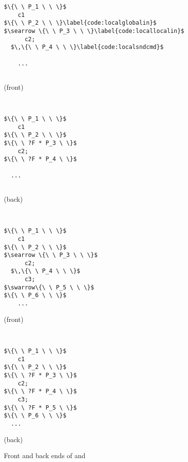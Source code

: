 \begin{figure}
\begin{minipage}{.15\textwidth}
\begin{lstlisting}[basicstyle=\linespread{0.8}\normalfont\footnotesize\tt]
$\{\ \ P_1 \ \ \}$
    c1
$\{\ \ P_2 \ \ \}\label{code:localglobalin}$
$\searrow \{\ \ P_3 \ \ \}\label{code:locallocalin}$
      c2;
  $\,\{\ \ P_4 \ \ \}\label{code:localsndcmd}$

    ...


\end{lstlisting}
\centerline{\footnotesize(front)}
\end{minipage} \vline ~
\begin{minipage}{.15\textwidth}
\begin{lstlisting}[numbers=none, basicstyle=\linespread{0.8}\normalfont\footnotesize\tt]
$\{\ \ P_1 \ \ \}$
    c1
$\{\ \ P_2 \ \ \}$
$\{\ \ ?F * P_3 \ \}$
    c2;
$\{\ \ ?F * P_4 \ \}$

  ...


\end{lstlisting}
\centerline{\footnotesize(back)}
\end{minipage} \vline ~
\begin{minipage}{.15\textwidth}
\begin{lstlisting}[numbers=none, basicstyle=\linespread{0.8}\normalfont\footnotesize\tt]
$\{\ \ P_1 \ \ \}$
    c1
$\{\ \ P_2 \ \ \}$
$\searrow \{\ \ P_3 \ \ \}$
      c2;
  $\,\{\ \ P_4 \ \ \}$
      c3;
$\swarrow\{\ \ P_5 \ \ \}$
$\{\ \ P_6 \ \ \}$
    ...
\end{lstlisting}
\centerline{\footnotesize(front)}
\end{minipage} \vline ~
\begin{minipage}{.15\textwidth}
\begin{lstlisting}[numbers=none, basicstyle=\linespread{0.8}\normalfont\footnotesize\tt]
$\{\ \ P_1 \ \ \}$
    c1
$\{\ \ P_2 \ \ \}$
$\{\ \ ?F * P_3 \ \}$
    c2;
$\{\ \ ?F * P_4 \ \}$
    c3;
$\{\ \ ?F * P_5 \ \}$
$\{\ \ P_6 \ \ \}$
  ...
\end{lstlisting}
\centerline{\footnotesize(back)}
\end{minipage}
\caption{Front and back ends of  and }
\label{figure:backend}
\end{figure}

